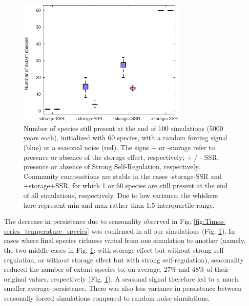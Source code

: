 \documentclass[smallcondensed,referee]{svjour3}       %
\begin{document}
\begin{figure}[!ht]
\begin{centering}
\includegraphics[width=0.75\textwidth]{Fig2}
\par\end{centering}
\caption{Number of species still present at the end of 100 simulations (5000
years each), initialized with 60 species, with a random forcing signal
(blue) or a seasonal noise (red). The signs + or -storage refer to
presence or absence of the storage effect, respectively; + / - SSR,
presence or absence of Strong Self-Regulation, respectively. Community
compositions are stable in the cases -storage-SSR and +storage+SSR,
for which 1 or 60 species are still present at the end of all simulations,
respectively. Due to low variance, the whiskers here represent min
and max rather than 1.5 interquartile range. \label{fig:Persistence-of-species} }
\end{figure}

The decrease in persistence due to seasonality observed in Fig. \ref{fig:Times-series_temperature_species}
was confirmed in all our simulations (Fig. \ref{fig:Persistence-of-species}).
In cases where final species richness varied from one simulation to
another (namely, the two middle cases in Fig. \ref{fig:Persistence-of-species}:
with storage effect but without strong self-regulation, or without
storage effect but with strong self-regulation), seasonality reduced
the number of extant species to, on average, 27\% and 48\% of their
original values, respectively (Fig. \ref{fig:Persistence-of-species}).
A seasonal signal therefore led to a much smaller average persistence.
There was also less variance in persistence between seasonally forced
simulations compared to random noise simulations. 
\end{document}
